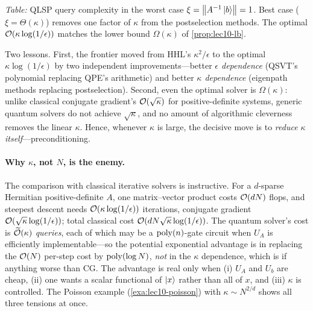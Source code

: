 \noindent\emph{Table:} QLSP query complexity in the worst case
$\xi=\left\lVert A^{-1}\ket b \right\rVert=1$. Best case ($\xi=\Theta(\kappa)$) removes one factor of
$\kappa$ from the postselection methods. The optimal $\mathcal{O}(\kappa\log(1/\epsilon))$
matches the lower bound $\Omega(\kappa)$ of \cref{prop:lec10-lb}.

Two lessons. First, the frontier moved from HHL's $\kappa^2/\epsilon$ to the optimal
$\kappa\log(1/\epsilon)$ by two independent improvements---better \emph{$\epsilon$
dependence} (QSVT's polynomial replacing QPE's arithmetic) and better \emph{$\kappa$
dependence} (eigenpath methods replacing postselection). Second, even the optimal solver
is $\Omega(\kappa)$: unlike classical conjugate gradient's $\mathcal{O}(\sqrt\kappa)$ for
positive-definite systems, generic quantum solvers do not achieve $\sqrt\kappa$, and no
amount of algorithmic cleverness removes the linear $\kappa$. Hence, whenever $\kappa$ is
large, the decisive move is to \emph{reduce $\kappa$ itself}---preconditioning.

\paragraph{Why $\kappa$, not $N$, is the enemy.}
The comparison with classical iterative solvers is instructive. For a $d$-sparse
Hermitian positive-definite $A$, one matrix--vector product costs $\mathcal{O}(dN)$ flops, and
steepest descent needs $\mathcal{O}(\kappa\log(1/\epsilon))$ iterations, conjugate gradient
$\mathcal{O}(\sqrt\kappa\log(1/\epsilon))$; total classical cost
$\mathcal{O}(dN\sqrt\kappa\log(1/\epsilon))$. The quantum solver's cost is
$\widetilde{\mathcal{O}}(\kappa)$ \emph{queries}, each of which may be a $\operatorname{poly}(n)$-gate
circuit when $U_A$ is efficiently implementable---so the potential exponential advantage
is in replacing the $\mathcal{O}(N)$ per-step cost by $\operatorname{poly}(\log N)$, \emph{not} in the
$\kappa$ dependence, which is if anything worse than CG. The advantage is real only when
(i) $U_A$ and $U_b$ are cheap, (ii) one wants a scalar functional of $\ket x$ rather than
all of $x$, and (iii) $\kappa$ is controlled. The Poisson example
(\cref{exa:lec10-poisson}) with $\kappa\sim N^{2/d}$ shows all three tensions at once.

